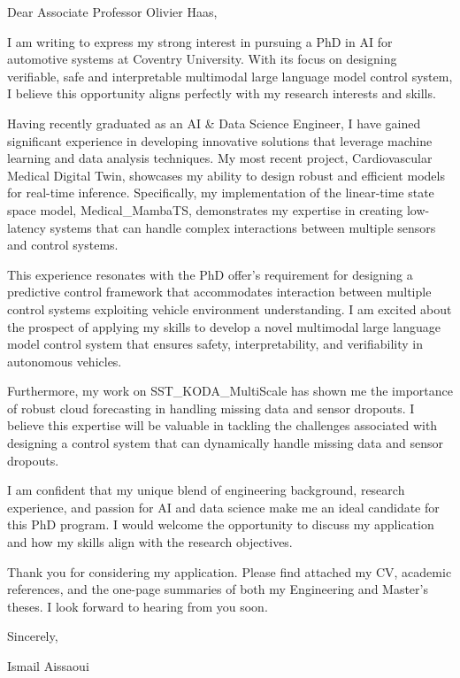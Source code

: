 \documentclass{letter}
\begin{document}
\begin{letter}{}

\opening{Dear Associate Professor Olivier Haas,}

I am writing to express my strong interest in pursuing a PhD in AI for automotive systems at Coventry University. With its focus on designing verifiable, safe and interpretable multimodal large language model control system, I believe this opportunity aligns perfectly with my research interests and skills.

Having recently graduated as an AI \& Data Science Engineer, I have gained significant experience in developing innovative solutions that leverage machine learning and data analysis techniques. My most recent project, Cardiovascular Medical Digital Twin, showcases my ability to design robust and efficient models for real-time inference. Specifically, my implementation of the linear-time state space model, Medical\_MambaTS, demonstrates my expertise in creating low-latency systems that can handle complex interactions between multiple sensors and control systems.

This experience resonates with the PhD offer's requirement for designing a predictive control framework that accommodates interaction between multiple control systems exploiting vehicle environment understanding. I am excited about the prospect of applying my skills to develop a novel multimodal large language model control system that ensures safety, interpretability, and verifiability in autonomous vehicles.

Furthermore, my work on SST\_KODA\_MultiScale has shown me the importance of robust cloud forecasting in handling missing data and sensor dropouts. I believe this expertise will be valuable in tackling the challenges associated with designing a control system that can dynamically handle missing data and sensor dropouts.

I am confident that my unique blend of engineering background, research experience, and passion for AI and data science make me an ideal candidate for this PhD program. I would welcome the opportunity to discuss my application and how my skills align with the research objectives.

Thank you for considering my application. Please find attached my CV, academic references, and the one-page summaries of both my Engineering and Master's theses. I look forward to hearing from you soon.

\closing{Sincerely,}
Ismail Aissaoui

\end{letter}
\end{document}
